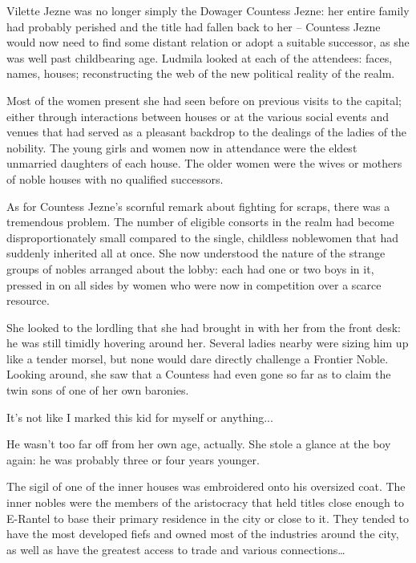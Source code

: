  

Vilette Jezne was no longer simply the Dowager Countess Jezne: her entire family had probably perished and the title had fallen back to her – Countess Jezne would now need to find some distant relation or adopt a suitable successor, as she was well past childbearing age. Ludmila looked at each of the attendees: faces, names, houses; reconstructing the web of the new political reality of the realm.

 

Most of the women present she had seen before on previous visits to the capital; either through interactions between houses or at the various social events and venues that had served as a pleasant backdrop to the dealings of the ladies of the nobility. The young girls and women now in attendance were the eldest unmarried daughters of each house. The older women were the wives or mothers of noble houses with no qualified successors.

 

As for Countess Jezne’s scornful remark about fighting for scraps, there was a tremendous problem. The number of eligible consorts in the realm had become disproportionately small compared to the single, childless noblewomen that had suddenly inherited all at once. She now understood the nature of the strange groups of nobles arranged about the lobby: each had one or two boys in it, pressed in on all sides by women who were now in competition over a scarce resource.

 

She looked to the lordling that she had brought in with her from the front desk: he was still timidly hovering around her. Several ladies nearby were sizing him up like a tender morsel, but none would dare directly challenge a Frontier Noble. Looking around, she saw that a Countess had even gone so far as to claim the twin sons of one of her own baronies.

 

It’s not like I marked this kid for myself or anything...

 

He wasn’t too far off from her own age, actually. She stole a glance at the boy again: he was probably three or four years younger.

 

The sigil of one of the inner houses was embroidered onto his oversized coat. The inner nobles were the members of the aristocracy that held titles close enough to E-Rantel to base their primary residence in the city or close to it. They tended to have the most developed fiefs and owned most of the industries around the city, as well as have the greatest access to trade and various connections…

